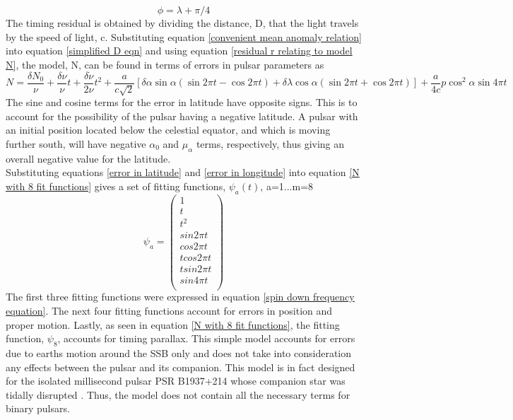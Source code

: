 \documentclass[12pt]{article}
\begin{document}
	\begin{equation}\label{convenient mean anomaly relation}
	\phi=\lambda +\pi/4
	\end{equation}
	The timing residual is obtained by dividing the distance, D, that the light travels by the speed of light, c. Substituting equation \ref{convenient mean anomaly relation} into equation \ref{simplified D eqn} and using equation \ref{residual r relating to model N}, the model, N, can be found in terms of errors in pulsar parameters as
	\begin{equation}\label{N with 8 fit functions}
	N=\frac{\delta N_{0}}{\nu}+\frac{\delta \nu}{\nu}t+\frac{\delta \dot\nu }{2 \nu}t^2+\frac{a}{c \sqrt{2}}[\delta\alpha \sin{\alpha}(\sin{2 \pi t}-\cos{2 \pi t})+\delta\lambda \cos{\alpha}(\sin{2 \pi t}+\cos{2 \pi t})]+\frac{a}{4c}p\cos^{2}\alpha \sin{4 \pi t}
	\end{equation}
	The sine and cosine terms for the error in latitude have opposite signs. This is to account for the possibility of the pulsar having a negative latitude. A pulsar with an initial position located below the celestial equator, and which is moving further south, will have negative $\alpha_{0}$ and $\mu_{\alpha}$ terms, respectively, thus giving an overall negative value for the latitude.\\
	Substituting equations \ref{error in latitude} and \ref{error in longitude} into equation \ref{N with 8 fit functions} gives a set of fitting functions, $\psi_a(t)$, a=1...m=8 \cite{blandford1976arrival} 
	$$
	\psi_a=
	\begin{pmatrix}
	1\\
	t\\
	t^2\\
	sin2 \pi t\\
	cos2 \pi t\\
	t cos2 \pi t\\
	t sin2 \pi t\\
	sin4 \pi t\\
	\end{pmatrix}
	$$
	The first three fitting functions were expressed in equation \ref{spin down frequency equation}. The next four fitting functions account for errors in position and proper motion. Lastly, as seen in equation \ref{N with 8 fit functions}, the fitting function, $\psi_{8}$, accounts for timing parallax. 
	This simple model accounts for  errors due to earths motion around the SSB only and does not take into consideration any effects between the pulsar and its companion. This model is in fact designed for the isolated millisecond pulsar PSR B1937+214 whose companion star was tidally disrupted \cite{kochhar1984model}. Thus, the model does not contain all the necessary terms for binary pulsars.\\
	
\end{document}
